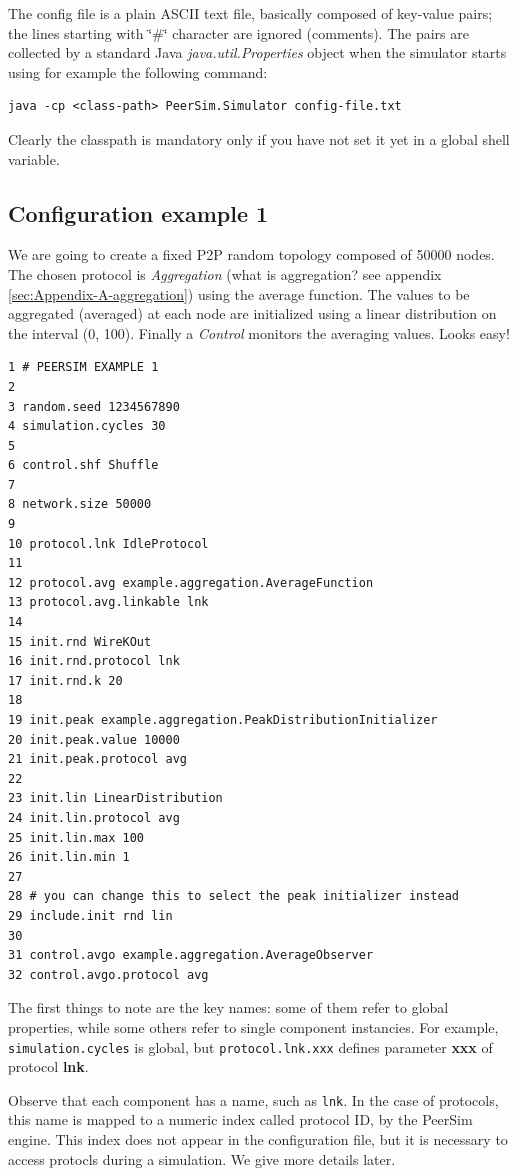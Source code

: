 \documentclass[a4paper,11pt]{article}
\begin{document}
The config file is a plain ASCII text file, basically composed of
key-value pairs; the lines starting with \char`\"{}\#\char`\"{} character
are ignored (comments). The pairs are collected by a standard Java
\emph{java.util.Properties} object when the simulator starts using
for example the following command:

\begin{verbatim}
java -cp <class-path> PeerSim.Simulator config-file.txt \end{verbatim}


Clearly the classpath is mandatory only if you have not set it yet
in a global shell variable.

\subsection{Configuration example 1}

We are going to create a fixed P2P random topology composed of 50000
nodes.
The chosen protocol is \emph{Aggregation} (what is
aggregation? see appendix \ref{sec:Appendix-A-aggregation}) using
the average function. The values to be aggregated (averaged) at each
node are initialized using a linear distribution on the interval (0,
100). Finally a \emph{Control} monitors the averaging values.
Looks easy!

\footnotesize
\begin{verbatim}
1 # PEERSIM EXAMPLE 1
2
3 random.seed 1234567890
4 simulation.cycles 30
5
6 control.shf Shuffle
7
8 network.size 50000
9  
10 protocol.lnk IdleProtocol
11
12 protocol.avg example.aggregation.AverageFunction
13 protocol.avg.linkable lnk
14 
15 init.rnd WireKOut
16 init.rnd.protocol lnk
17 init.rnd.k 20
18 
19 init.peak example.aggregation.PeakDistributionInitializer
20 init.peak.value 10000
21 init.peak.protocol avg
22
23 init.lin LinearDistribution
24 init.lin.protocol avg
25 init.lin.max 100
26 init.lin.min 1
27
28 # you can change this to select the peak initializer instead
29 include.init rnd lin
30
31 control.avgo example.aggregation.AverageObserver
32 control.avgo.protocol avg
\end{verbatim}
\normalsize


The first things to note are the
key names: some of them refer to global properties, while some
others refer to single component instancies. For example,
\texttt{simulation.cycles} is global, but \texttt{protocol.lnk.xxx}
defines parameter \textbf{xxx} of protocol \textbf{lnk}.

Observe that each component has a name,
such as \texttt{lnk}. In the case of protocols, this
name is mapped to a numeric index called protocol ID, by the PeerSim
engine.
This index does not appear in the configuration file, but it is necessary
to access protocls during a simulation.
We give more details later.
\end{document}
